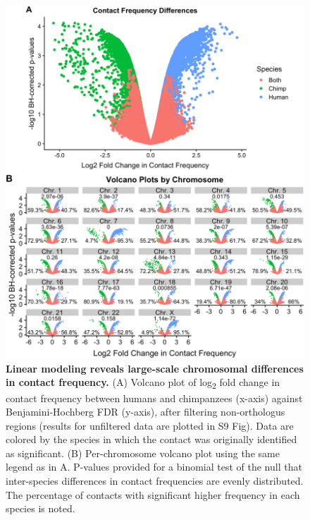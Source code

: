 \begin{figure}
\centering
\includegraphics[width=6in]{img/fig2.PNG}
\caption[Linear modeling reveals large-scale chromosomal differences in contact frequency.]{\textbf{Linear modeling reveals large-scale chromosomal differences in contact frequency.} (A) Volcano plot of log\textsubscript{2} fold change in contact frequency between humans and chimpanzees (x-axis) against Benjamini-Hochberg FDR (y-axis), after filtering non-orthologus regions (results for unfiltered data are plotted in S9 Fig). Data are colored by the species in which the contact was originally identified as significant. (B) Per-chromosome volcano plot using the same legend as in A. P-values provided for a binomial test of the null that inter-species differences in contact frequencies are evenly distributed. The percentage of contacts with significant higher frequency in each species is noted.}
\label{fig:ch02-fig2}
\end{figure}

